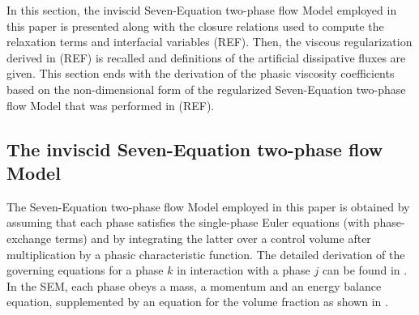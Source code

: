 \documentclass[preprint,10pt]{elsarticle}
\begin{document}

In this section, the inviscid Seven-Equation two-phase flow Model employed in this paper is presented along with the closure relations used to compute the relaxation terms and interfacial variables (REF). Then, the viscous regularization derived in (REF) is recalled and definitions of the artificial dissipative fluxes are given. This section ends with the derivation of the phasic viscosity coefficients based on the non-dimensional form of the regularized Seven-Equation two-phase flow Model that was performed in (REF). 
%
\subsection{The inviscid Seven-Equation two-phase flow Model}
%
The Seven-Equation two-phase flow Model employed in this paper is obtained by assuming that each phase satisfies the single-phase Euler 
equations (with phase-exchange terms) and by integrating the latter over a control volume after multiplication by a phasic characteristic 
function. The detailed derivation of the governing equations for a phase $k$ in interaction with a phase $j$ can be found in \cite{SEM}. 
In the SEM, each phase obeys a mass, a momentum and an energy balance equation, supplemented by an equation for the volume fraction as shown in .
%
\end{document}
